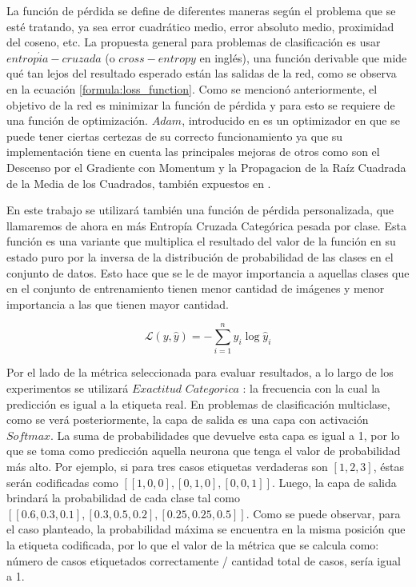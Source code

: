   La función de pérdida se define de diferentes maneras según el problema que se esté tratando, ya sea error cuadrático medio, error absoluto medio, proximidad del coseno, etc. La propuesta general para problemas de clasificación es usar \(entrop{\acute i}a-cruzada\) (o \(cross-entropy\) en inglés), una función derivable que mide qué tan lejos del resultado esperado están las salidas de la red, como se observa en la ecuación \ref{formula:loss_function}. Como se mencionó anteriormente, el objetivo de la red es minimizar la función de pérdida y para esto se requiere de una función de optimización. \(Adam\), introducido en \cite{kingma2014adam} es un optimizador en que se puede tener ciertas certezas de su correcto funcionamiento ya que su implementación tiene en cuenta las principales mejoras de otros como son el Descenso por el Gradiente con Momentum y la Propagacion de la Raíz Cuadrada de la Media de los Cuadrados, también expuestos en \cite{choi2019empirical}.
  
  En este trabajo se utilizará también una función de pérdida personalizada, que llamaremos de ahora en más Entropía Cruzada Categórica pesada por clase. Esta función es una variante que multiplica el resultado del valor de la función en su estado puro por la inversa de la distribución de probabilidad de las clases en el conjunto de datos. Esto hace que se le de mayor importancia a aquellas clases que en el conjunto de entrenamiento tienen menor cantidad de imágenes y menor importancia a las que tienen mayor cantidad.
  
  \begin{equation}\label{formula:custom_loss_function}
  \mathcal{L}(y, \hat{y})=-\sum_{i=1}^{n} y_{i} \log \hat{y}_{i}
  \end{equation}
  

 Por el lado de la métrica seleccionada para evaluar resultados, a lo largo de los experimentos se utilizará \(Exactitud\) \(Categorica\) \cite{scikit-learn}: la frecuencia con la cual la predicción es igual a la etiqueta real. En problemas de clasificación multiclase, como se verá posteriormente, la capa de salida es una capa con activación \(Softmax\). La suma de probabilidades que devuelve esta capa es igual a 1, por lo que se toma como predicción aquella neurona que tenga el valor de probabilidad más alto. 
 Por ejemplo, si para tres casos etiquetas verdaderas son \([1, 2, 3]\), éstas serán codificadas como \([[1, 0, 0], [0, 1, 0], [0, 0, 1]]\). Luego, la capa de salida brindará la probabilidad de cada clase tal como \([[0.6, 0.3, 0.1], [0.3, 0.5, 0.2], [0.25, 0.25, 0.5]]\). Como se puede observar, para el caso planteado, la probabilidad máxima se encuentra en la misma posición que la etiqueta codificada, por lo que el valor de la métrica que se calcula como: número de casos etiquetados correctamente / cantidad total de casos, sería igual a 1.


